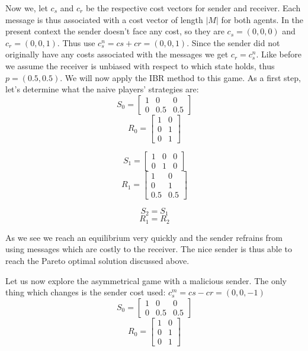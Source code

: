 \documentclass[10]{article}
\begin{document}
Now we, let $c_s$ and $c_r$ be the respective cost vectors for sender and receiver. Each message is thus associated with a cost vector of length $|M|$ for both agents. In the present context the sender doesn't face any cost, so they are $c_s=(0,0,0)$ and $c_r=(0,0,1)$. Thus use $c_s^n=cs + cr=(0,0,1)$. Since the sender did not originally have any costs associated with the messages we get $c_r=c_s^n$. Like before we assume the receiver is unbiased with respect to which state holds, thus $p=(0.5,0.5)$.
We will now apply the IBR method to this game. As a first step, let's determine what the naive players' strategies are:\\
\begin{equation*}
S_0=
\begin{bmatrix}
1 & 0 & 0\\
0 & 0.5 & 0.5
\end{bmatrix}
\end{equation*}
\begin{equation*}
R_0=
\begin{bmatrix}
1 & 0\\
0 & 1\\
0 & 1
\end{bmatrix}
\end{equation*}

\begin{equation*}
S_1=
\begin{bmatrix}
1 & 0 & 0\\
0 & 1 & 0
\end{bmatrix}
\end{equation*}
\begin{equation*}
R_1=
\begin{bmatrix}
1 & 0\\
0 & 1\\
0.5 & 0.5
\end{bmatrix}
\end{equation*}

\begin{equation*}
S_2=S_1
\end{equation*}
\begin{equation*}
R_1=R_2
\end{equation*}

As we see we reach an equilibrium very quickly and the sender refrains from using messages which are costly to the receiver. The nice sender is thus able to reach the Pareto optimal solution discussed above.

Let us now explore the asymmetrical game with a malicious sender. The only thing which changes is the sender cost used: $c_s^m=cs - cr=(0,0,-1)$
\begin{equation*}
S_0=
\begin{bmatrix}
1 & 0 & 0\\
0 & 0.5 & 0.5
\end{bmatrix}
\end{equation*}
\begin{equation*}
R_0=
\begin{bmatrix}
1 & 0\\
0 & 1\\
0 & 1
\end{bmatrix}
\end{equation*}
\end{document}
